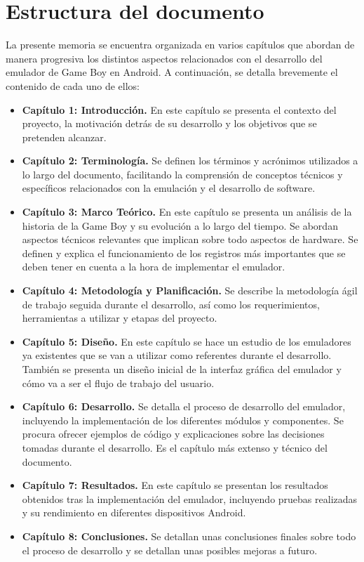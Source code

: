 \section{Estructura del documento}
La presente memoria se encuentra organizada en varios capítulos que abordan de manera progresiva los distintos aspectos relacionados con el desarrollo del emulador de Game Boy en Android. A continuación, se detalla brevemente el contenido de cada uno de ellos:

\begin{itemize}
    \item \textbf{Capítulo 1: Introducción.} En este capítulo se presenta el contexto del proyecto, la motivación detrás de su desarrollo y los objetivos que se pretenden alcanzar.
    \item \textbf{Capítulo 2: Terminología.} Se definen los términos y acrónimos utilizados a lo largo del documento, facilitando la comprensión de conceptos técnicos y específicos relacionados con la emulación y el desarrollo de software.
    \item \textbf{Capítulo 3: Marco Teórico.} En este capítulo se presenta un análisis de la historia de la Game Boy y su evolución a lo largo del tiempo. Se abordan aspectos técnicos relevantes que implican sobre todo aspectos de hardware. Se definen y explica el funcionamiento de los registros más importantes que se deben tener en cuenta a la hora de implementar el emulador.
    \item \textbf{Capítulo 4: Metodología y Planificación.} Se describe la metodología ágil de trabajo seguida durante el desarrollo, así como los requerimientos, herramientas a utilizar y etapas del proyecto.
    \item \textbf{Capítulo 5: Diseño.} En este capítulo se hace un estudio de los emuladores ya existentes que se van a utilizar como referentes durante el desarrollo. También se presenta un diseño inicial de la interfaz gráfica del emulador y cómo va a ser el flujo de trabajo del usuario.
    \item \textbf{Capítulo 6: Desarrollo.} Se detalla el proceso de desarrollo del emulador, incluyendo la implementación de los diferentes módulos y componentes. Se procura ofrecer ejemplos de código y explicaciones sobre las decisiones tomadas durante el desarrollo. Es el capítulo más extenso y técnico del documento.
    \item \textbf{Capítulo 7: Resultados.} En este capítulo se presentan los resultados obtenidos tras la implementación del emulador, incluyendo pruebas realizadas y su rendimiento en diferentes dispositivos Android.
    \item \textbf{Capítulo 8: Conclusiones.} Se detallan unas conclusiones finales sobre todo el proceso de desarrollo y se detallan unas posibles mejoras a futuro.
\end{itemize}

